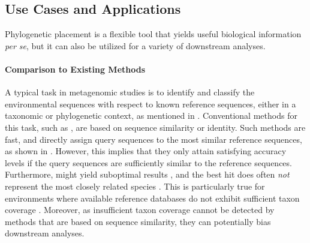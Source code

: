 \subsection{Use Cases and Applications}
\label{ch:Foundations:sec:PhylogeneticPlacement:sub:UseCasesApplications}

Phylogenetic placement is a flexible tool that yields useful biological information \emph{per se},
but it can also be utilized for a variety of downstream analyses.

\paragraph{Comparison to Existing Methods}
\label{ch:Foundations:sec:PhylogeneticPlacement:sub:UseCasesApplications:par:Comparison}

A typical task in metagenomic studies is to identify and classify the environmental sequences with respect
to known reference sequences, either in a taxonomic or phylogenetic context,
as mentioned in .
Conventional methods for this task, such as  \cite{Altschul1990},
are based on sequence similarity or identity.
Such methods are fast, and directly assign query sequences to the most similar reference sequences,
as shown in .
However, this implies that they only attain satisfying accuracy levels
if the query sequences are sufficiently similar to the reference sequences.
Furthermore,  might yield suboptimal results \cite{Shah2018},
and the best  hit does often \emph{not} represent the most closely related species \cite{Koski2001}.
This is particularly true for environments where available reference databases do not exhibit
sufficient taxon coverage \citep{Mahe2017}.
Moreover, as insufficient taxon coverage cannot be detected by methods that are based on sequence similarity,
they can potentially bias downstream analyses.

